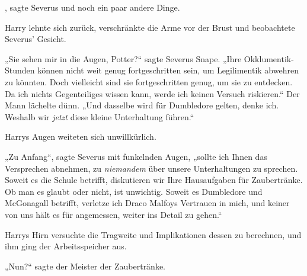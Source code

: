 , sagte Severus und noch ein paar andere Dinge.

Harry lehnte sich zurück, verschränkte die Arme vor der Brust und beobachtete Severus’ Gesicht.

„Sie sehen mir in die Augen, Potter?“ sagte Severus Snape.
„Ihre Okklumentik-Stunden können nicht weit genug fortgeschritten sein, um Legilimentik abwehren zu könnten. Doch vielleicht sind sie fortgeschritten genug, um sie zu entdecken. Da ich nichts Gegenteiliges wissen kann, werde ich keinen Versuch riskieren.“ Der Mann lächelte dünn.
„Und dasselbe wird für Dumbledore gelten, denke ich. Weshalb wir \emph{jetzt} diese kleine Unterhaltung führen.“

Harrys Augen weiteten sich unwillkürlich.

„Zu Anfang“, sagte Severus mit funkelnden Augen, „sollte ich Ihnen das Versprechen abnehmen, zu \emph{niemandem} über unsere Unterhaltungen zu sprechen. Soweit es die Schule betrifft, diskutieren wir Ihre Hausaufgaben für Zaubertränke. Ob man es glaubt oder nicht, ist unwichtig. Soweit es Dumbledore und McGonagall betrifft, verletze ich Draco Malfoys Vertrauen in mich, und keiner von uns hält es für angemessen, weiter ins Detail zu gehen.“

Harrys Hirn versuchte die Tragweite und Implikationen dessen zu berechnen, und ihm ging der Arbeitsspeicher aus.

„Nun?“ sagte der Meister der Zaubertränke.

